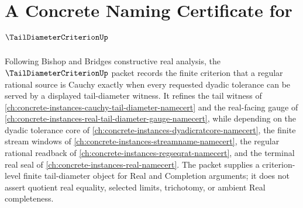 \chapter{A Concrete Naming Certificate for $\TailDiameterCriterionUp$}
\label{ch:concrete-instances-tail-diameter-criterion-namecert}

Following Bishop and Bridges constructive real analysis, the $\TailDiameterCriterionUp$ packet records the finite criterion that a regular rational source is Cauchy exactly when every requested dyadic tolerance can be served by a displayed tail-diameter witness. It refines the tail witness of \autoref{ch:concrete-instances-cauchy-tail-diameter-namecert} and the real-facing gauge of \autoref{ch:concrete-instances-real-tail-diameter-gauge-namecert}, while depending on the dyadic tolerance core of \autoref{ch:concrete-instances-dyadicratcore-namecert}, the finite stream windows of \autoref{ch:concrete-instances-streamname-namecert}, the regular rational readback of \autoref{ch:concrete-instances-regseqrat-namecert}, and the terminal real seal of \autoref{ch:concrete-instances-real-namecert}. The packet supplies a criterion-level finite tail-diameter object for Real and Completion arguments; it does not assert quotient real equality, selected limits, trichotomy, or ambient Real completeness.

